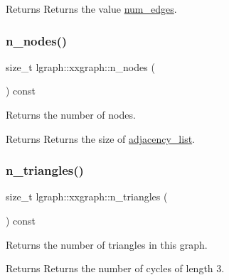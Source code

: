 \begin{DoxyReturn}{Returns}
Returns the value \hyperlink{classlgraph_1_1xxgraph_a6765a9a3be42f6e0f824635c593b35d7}{num\+\_\+edges}. 
\end{DoxyReturn}
\mbox{\label{classlgraph_1_1xxgraph_a67f651617ada4053b569102b9a54cab0}} 
\subsubsection{\texorpdfstring{n\+\_\+nodes()}{n\_nodes()}}
{\footnotesize\ttfamily size\+\_\+t lgraph\+::xxgraph\+::n\+\_\+nodes (\begin{DoxyParamCaption}{ }\end{DoxyParamCaption}) const\hspace{0.3cm}{\ttfamily [inherited]}}



Returns the number of nodes. 

\begin{DoxyReturn}{Returns}
Returns the size of \hyperlink{classlgraph_1_1xxgraph_a31cf82d0b20be05290be259dc97a51ec}{adjacency\+\_\+list}. 
\end{DoxyReturn}
\mbox{\label{classlgraph_1_1xxgraph_a90a9b60caf18179576af61dc962b95e3}} 
\subsubsection{\texorpdfstring{n\+\_\+triangles()}{n\_triangles()}}
{\footnotesize\ttfamily size\+\_\+t lgraph\+::xxgraph\+::n\+\_\+triangles (\begin{DoxyParamCaption}{ }\end{DoxyParamCaption}) const\hspace{0.3cm}{\ttfamily [inherited]}}



Returns the number of triangles in this graph. 

\begin{DoxyReturn}{Returns}
Returns the number of cycles of length 3. 
\end{DoxyReturn}
\mbox{\label{classlgraph_1_1wugraph_a3debc0be0d08b7cfcbe942aadbe81e1f}} 
